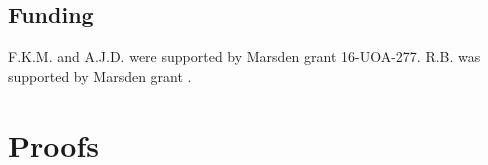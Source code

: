 \documentclass[oneside]{article}
\begin{document}
\subsection*{Funding}
F.K.M. and A.J.D. were supported by Marsden grant 16-UOA-277. R.B. was
supported by Marsden grant .







\newpage
\appendix

\section{Proofs}
\label{appendix::sec:proofs}
\end{document}
